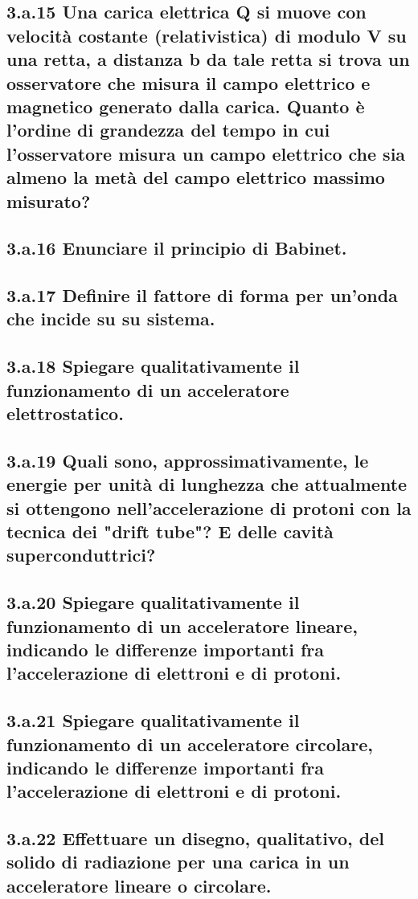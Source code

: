 \subsection*{3.a.15 Una carica elettrica Q si muove con velocità costante (relativistica) di modulo V su una retta, a distanza b da tale retta si trova un osservatore che misura il campo elettrico e magnetico generato dalla carica. Quanto è l'ordine di grandezza del tempo in cui l'osservatore misura un campo elettrico che sia almeno la metà del campo elettrico massimo misurato?}

\subsection*{3.a.16 Enunciare il principio di Babinet.}

\subsection*{3.a.17 Definire il fattore di forma per un'onda che incide su su sistema.}

\subsection*{3.a.18 Spiegare qualitativamente il funzionamento di un acceleratore elettrostatico.}

\subsection*{3.a.19 Quali sono, approssimativamente, le energie per unità di lunghezza che attualmente si ottengono nell’accelerazione di protoni con la tecnica dei "drift tube"? E delle cavità superconduttrici?}
\subsection*{3.a.20 Spiegare qualitativamente il funzionamento di un acceleratore lineare, indicando le differenze importanti fra l’accelerazione di elettroni e di protoni.}

\subsection*{3.a.21 Spiegare qualitativamente il funzionamento di un acceleratore circolare, indicando le differenze importanti fra l’accelerazione di elettroni e di protoni.}

\subsection*{3.a.22 Effettuare un disegno, qualitativo, del solido di radiazione per una carica in un acceleratore lineare o circolare.}

